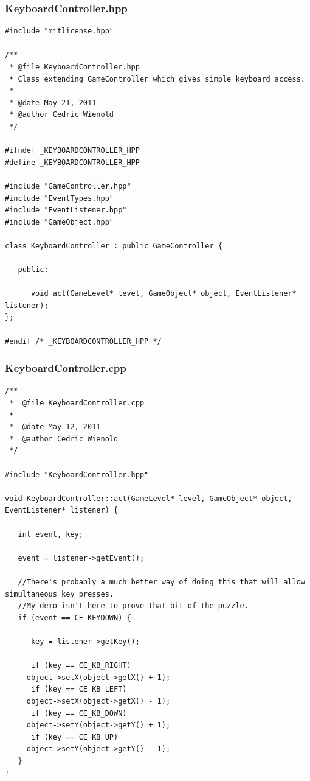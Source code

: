 \documentclass[12pt]{article}
\begin{document}
\subsubsection{KeyboardController.hpp}
\begin{lstlisting}[breaklines]
#include "mitlicense.hpp"

/**
 * @file KeyboardController.hpp
 * Class extending GameController which gives simple keyboard access.
 *
 * @date May 21, 2011
 * @author Cedric Wienold
 */

#ifndef _KEYBOARDCONTROLLER_HPP
#define _KEYBOARDCONTROLLER_HPP

#include "GameController.hpp"
#include "EventTypes.hpp"
#include "EventListener.hpp"
#include "GameObject.hpp"

class KeyboardController : public GameController {
   
   public:
   
      void act(GameLevel* level, GameObject* object, EventListener* listener);
};

#endif /* _KEYBOARDCONTROLLER_HPP */
\end{lstlisting}
\subsubsection{KeyboardController.cpp}
\begin{lstlisting}[breaklines]
/**
 *  @file KeyboardController.cpp
 *
 *  @date May 12, 2011
 *  @author Cedric Wienold
 */

#include "KeyboardController.hpp"

void KeyboardController::act(GameLevel* level, GameObject* object, EventListener* listener) {
   
   int event, key;
   
   event = listener->getEvent();
   
   //There's probably a much better way of doing this that will allow simultaneous key presses.
   //My demo isn't here to prove that bit of the puzzle.   
   if (event == CE_KEYDOWN) {
      
      key = listener->getKey();
      
      if (key == CE_KB_RIGHT)
	 object->setX(object->getX() + 1);
      if (key == CE_KB_LEFT)
	 object->setX(object->getX() - 1);
      if (key == CE_KB_DOWN)
	 object->setY(object->getY() + 1);
      if (key == CE_KB_UP)
	 object->setY(object->getY() - 1);	 
   }
}
\end{lstlisting}
\end{document}
